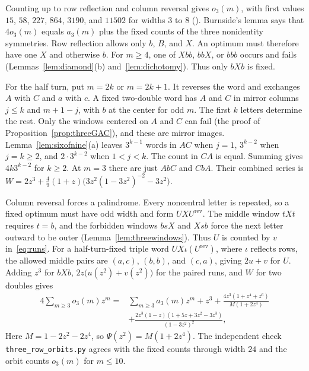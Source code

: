 \begin{remark}\label{rem:threeorbits}
Counting up to row reflection and column reversal gives $o_3(m)$,
with first values $15$, $58$, $227$, $864$, $3190$, and $11502$
for widths $3$ to $8$ (). Burnside's lemma says that
$4o_3(m)$ equals $a_3(m)$ plus the fixed counts of the three nonidentity
symmetries. Row reflection allows only $b$, $B$, and $X$.
An optimum must therefore have one $X$ and otherwise $b$.
For $m\ge4$, one of $Xbb$, $bbX$, or $bbb$ occurs and fails
(Lemmas~\ref{lem:diamond}(b) and~\ref{lem:dichotomy}).
Thus only $bXb$ is fixed.

For the half turn, put $m=2k$ or $m=2k+1$.
It reverses the word and exchanges $A$ with $C$ and $a$ with $c$.
A fixed two-double word has $A$ and $C$ in mirror columns $j\le k$
and $m+1-j$, with $b$ at the center for odd $m$.
The first $k$ letters determine the rest. Only the windows centered
on $A$ and $C$ can fail (the proof of Proposition~\ref{prop:threeGAC}),
and these are mirror images. Lemma~\ref{lem:sixofnine}(a) leaves
$3^{k-1}$ words in $AC$ when $j=1$, $3^{k-2}$ when $j=k\ge2$,
and $2\cdot3^{k-2}$ when $1<j<k$. The count in $CA$ is equal.
Summing gives $4k3^{k-2}$ for $k\ge2$.
At $m=3$ there are just $AbC$ and $CbA$. Their combined series is
$W=2z^3+\frac49(1+z)\bigl(3z^2(1-3z^2)^{-2}-3z^2\bigr)$.

Column reversal forces a palindrome. Every noncentral letter is
repeated, so a fixed optimum must have odd width and form
$UXU^{\mathrm{rev}}$. The middle window $tXt$ requires $t=b$,
and the forbidden windows $bsX$ and $Xsb$ force the next letter
outward to be outer (Lemma~\ref{lem:threewindows}). Thus $U$ is
counted by $v$ in~\eqref{eq:runs}.
For a half-turn-fixed triple word $UX\iota(U^{\mathrm{rev}})$,
where $\iota$ reflects rows, the allowed middle pairs are
$(a,c)$, $(b,b)$, and $(c,a)$, giving $2u+v$ for $U$.
Adding $z^3$ for $bXb$, $2z\bigl(u(z^2)+v(z^2)\bigr)$ for the paired runs,
and $W$ for two doubles gives
\begin{align*}
4\sum_{m\ge3}o_3(m)z^m={}&\sum_{m\ge3}a_3(m)z^m+z^3+\frac{4z^3(1+z^4+z^6)}{M(1+2z^4)}\\
&+\frac{2z^3(1-z)(1+5z+3z^2-3z^3)}{(1-3z^2)^2},
\end{align*}
Here $M=1-2z^2-2z^4$, so $\Psi(z^2)=M(1+2z^4)$.
The independent check \nolinkurl{three_row_orbits.py} agrees with the
fixed counts through width $24$ and the orbit counts $o_3(m)$ for $m\le10$.
\end{remark}

